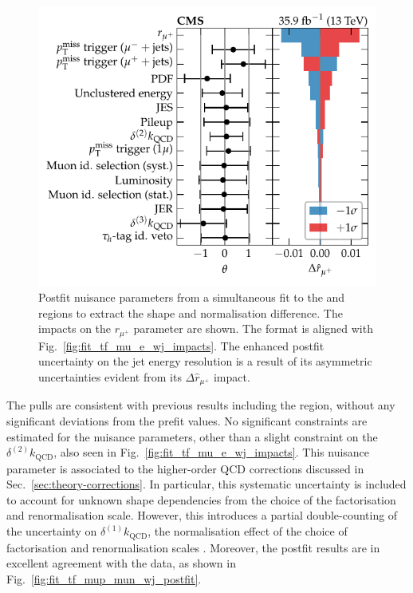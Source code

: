 \begin{figure}[htb]
    \centering
    \includegraphics{chapters/042_backgrounds/images/impacts_tfmup2munwj.pdf}
    \caption[Nuisance parameters from a fit to the positive and negative muon control regions.]{
        Postfit nuisance parameters from a simultaneous fit to the \mupplusjets and \munplusjets regions to extract the shape and normalisation difference. The impacts on the $r_{\mu^+}$ parameter are shown. The format is aligned with Fig.~\ref{fig:fit_tf_mu_e_wj_impacts}. The enhanced postfit uncertainty on the jet energy resolution is a result of its asymmetric uncertainties evident from its $\Delta \hat{r}_{\mu^+}$ impact.
    }
    \label{fig:fit_tf_mup_mun_wj_impacts}
\end{figure}
%
The pulls are consistent with previous results including the \muplusjets region, without any significant deviations from the prefit values. No significant constraints are estimated for the nuisance parameters, other than a slight constraint on the $\delta^{(2)}k_{\mathrm{QCD}}$, also seen in Fig.~\ref{fig:fit_tf_mu_e_wj_impacts}. This nuisance parameter is associated to the higher-order QCD corrections discussed in Sec.~\ref{sec:theory-corrections}. In particular, this systematic uncertainty is included to account for unknown shape dependencies from the choice of the factorisation and renormalisation scale. However, this introduces a partial double-counting of the uncertainty on $\delta^{(1)}k_{\mathrm{QCD}}$, the normalisation effect of the choice of factorisation and renormalisation scales \cite{Lindert:2017olm}. Moreover, the postfit results are in excellent agreement with the data, as shown in Fig.~\ref{fig:fit_tf_mup_mun_wj_postfit}.
